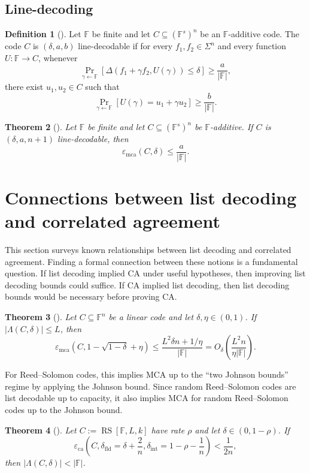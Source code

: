 \documentclass[11pt]{article}
\theoremstyle{plain}
\newtheorem{theorem}{Theorem}[section]
\theoremstyle{definition}
\newtheorem{definition}[theorem]{Definition}
\newcommand{\F}{\mathbb{F}}
\newcommand{\RS}[3]{\operatorname{RS}[#1,#2,#3]}
\newcommand{\epsca}{\varepsilon_{\mathrm{ca}}}
\newcommand{\epsmca}{\varepsilon_{\mathrm{mca}}}
\newcommand{\fld}{\mathrm{fld}}
\newcommand{\intr}{\mathrm{int}}
\newcommand{\abs}[1]{\left|#1\right|}
\DeclareMathOperator*{\Prb}{Pr}
\begin{document}
\subsection{Line-decoding}

\begin{definition}[\cite{GG25}]
Let $\F$ be finite and let $C\subseteq(\F^s)^n$ be an $\F$-additive code. The code $C$ is $(\delta,a,b)$ line-decodable if for every $f_1,f_2\in\Sigma^n$ and every function $U:\F\to C$, whenever
\[
  \Prb_{\gamma\leftarrow\F}[\Delta(f_1+\gamma f_2,U(\gamma))\le\delta]\ge \frac{a}{\abs{\F}},
\]
there exist $u_1,u_2\in C$ such that
\[
  \Prb_{\gamma\leftarrow\F}[U(\gamma)=u_1+\gamma u_2]\ge \frac{b}{\abs{\F}}.
\]
\end{definition}

\begin{theorem}[\cite{GG25}]
Let $\F$ be finite and let $C\subseteq(\F^s)^n$ be $\F$-additive. If $C$ is $(\delta,a,n+1)$ line-decodable, then
\[
  \epsmca(C,\delta)\le \frac{a}{\abs{\F}}.
\]
\end{theorem}

\section{Connections between list decoding and correlated agreement}

This section surveys known relationships between list decoding and correlated agreement. Finding a formal connection between these notions is a fundamental question. If list decoding implied CA under useful hypotheses, then improving list decoding bounds could suffice. If CA implied list decoding, then list decoding bounds would be necessary before proving CA.

\begin{theorem}[\cite{GCXK25}]
Let $C\subseteq\F^n$ be a linear code and let $\delta,\eta\in(0,1)$. If $\abs{\Lambda(C,\delta)}\le L$, then
\[
  \epsmca\left(C,1-\sqrt{1-\delta}+\eta\right)
  \le \frac{L^2\delta n+1/\eta}{\abs{\F}}
  =O_\delta\left(\frac{L^2 n}{\eta\abs{\F}}\right).
\]
\end{theorem}

For Reed--Solomon codes, this implies MCA up to the ``two Johnson bounds'' regime by applying the Johnson bound. Since random Reed--Solomon codes are list decodable up to capacity, it also implies MCA for random Reed--Solomon codes up to the Johnson bound.

\begin{theorem}[\cite{BCHKS25}]
Let $C:=\RS{\F}{L}{k}$ have rate $\rho$ and let $\delta\in(0,1-\rho)$. If
\[
  \epsca\left(C,\delta_{\fld}=\delta+\frac2n,
                 \delta_{\intr}=1-\rho-\frac1n\right)<\frac1{2n},
\]
then $\abs{\Lambda(C,\delta)}<\abs{\F}$.
\end{theorem}
\end{document}
